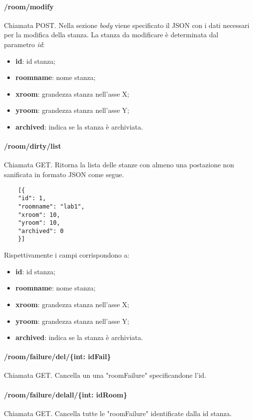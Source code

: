 \paragraph{/room/modify}
Chiamata POST. Nella sezione \textit{body} viene specificato il JSON con i dati necessari per la modifica della stanza. La stanza da modificare è determinata dal parametro \textit{id}:
\begin{itemize}
	\item \textbf{id}: id stanza;
	\item \textbf{roomname}: nome stanza;
	\item \textbf{xroom}: grandezza stanza nell'asse X;
	\item \textbf{yroom}: grandezza stanza nell'asse Y;
	\item \textbf{archived}: indica se la stanza è archiviata.	
\end{itemize}
\paragraph{/room/dirty/list}
Chiamata GET. Ritorna la lista delle stanze con almeno una postazione non sanificata in formato JSON come segue.	\\
\begin{center}
	\begin{lstlisting}
	[{
	"id": 1,
	"roomname": "lab1",
	"xroom": 10,
	"yroom": 10,
	"archived": 0
	}]
	\end{lstlisting}
\end{center}
Rispettivamente i campi corrispondono a:
\begin{itemize}
	\item \textbf{id}: id stanza;
	\item \textbf{roomname}: nome stanza;
	\item \textbf{xroom}: grandezza stanza nell'asse X;
	\item \textbf{yroom}: grandezza stanza nell'asse Y;
	\item \textbf{archived}: indica se la stanza è archiviata.	
\end{itemize}
\paragraph{/room/failure/del/\{int: idFail\}}
Chiamata GET. Cancella un una "roomFailure" specificandone l'id.
\paragraph{/room/failure/delall/\{int: idRoom\}}
Chiamata GET. Cancella tutte le "roomFailure" identificate dalla id stanza.
